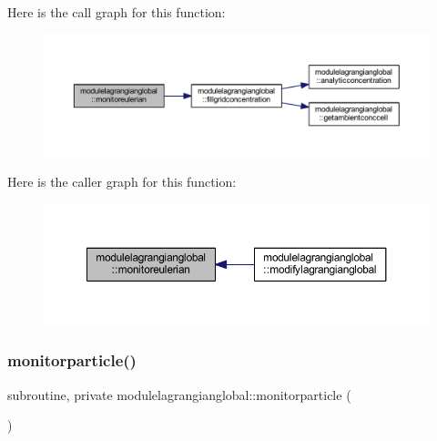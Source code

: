 Here is the call graph for this function\+:\nopagebreak
\begin{figure}[H]
\begin{center}
\leavevmode
\includegraphics[width=350pt]{namespacemodulelagrangianglobal_a6480946d4669725ebee110f6be9fba5b_cgraph}
\end{center}
\end{figure}
Here is the caller graph for this function\+:\nopagebreak
\begin{figure}[H]
\begin{center}
\leavevmode
\includegraphics[width=350pt]{namespacemodulelagrangianglobal_a6480946d4669725ebee110f6be9fba5b_icgraph}
\end{center}
\end{figure}
\mbox{\label{namespacemodulelagrangianglobal_a7e475a743774ea592904d34712f40255}} 
\subsubsection{\texorpdfstring{monitorparticle()}{monitorparticle()}}
{\footnotesize\ttfamily subroutine, private modulelagrangianglobal\+::monitorparticle (\begin{DoxyParamCaption}{ }\end{DoxyParamCaption})\hspace{0.3cm}{\ttfamily [private]}}

